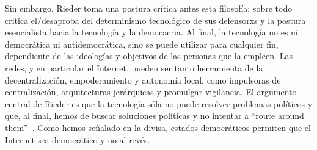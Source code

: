 Sin embargo, Rieder toma una postura crítica antes esta filosofía: sobre todo critica el/desaproba del determinismo tecnológico de sus defensorxs y la postura esencialista hacia la tecnología y la democacria.
Al final, la tecnología no es ni democrática ni antidemocrática, sino se puede utilizar para cualquier fin, dependiente de las ideologías y objetivos de las personas que la empleen.
Las redes, y en particular el Internet, pueden ser tanto herramienta de la decentralización, empoderamiento y autonomía local, como impulsoras de centralización, arquitecturas jerárquicas y promulgar vigilancia.
El argumento central de Rieder es que la tecnología sóla no puede resolver problemas políticos y que, al final, hemos de buscar soluciones políticas y no intentar a ``route around them''~\autocite{Rieder2012}.
Como hemos señalado en la divisa, estados democráticos permiten que el Internet sea democrático y no al revés.


